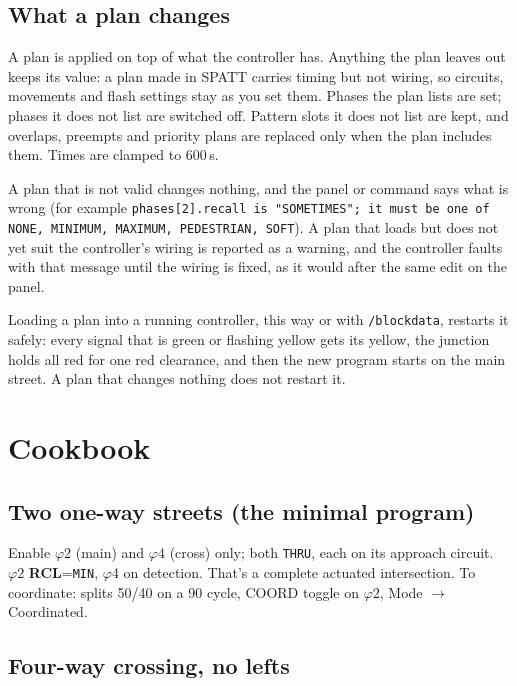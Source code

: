 \documentclass[11pt]{article}
\newcommand{\ph}[1]{\ensuremath{\varphi#1}}
\newcommand{\field}[1]{\textsf{\textbf{#1}}}
\begin{document}
\subsection{What a plan changes}

A plan is applied on top of what the controller has. Anything the plan leaves out
keeps its value: a plan made in SPATT carries timing but not wiring, so circuits,
movements and flash settings stay as you set them. Phases the plan lists are set;
phases it does not list are switched off. Pattern slots it does not list are kept,
and overlaps, preempts and priority plans are replaced only when the plan includes
them. Times are clamped to 600\,s.

A plan that is not valid changes nothing, and the panel or command says what is
wrong (for example \texttt{phases[2].recall is "SOMETIMES"; it must be one of NONE,
MINIMUM, MAXIMUM, PEDESTRIAN, SOFT}). A plan that loads but does not yet suit the
controller's wiring is reported as a warning, and the controller faults with that
message until the wiring is fixed, as it would after the same edit on the panel.

Loading a plan into a running controller, this way or with \texttt{/blockdata},
restarts it safely: every signal that is green or flashing yellow gets its yellow,
the junction holds all red for one red clearance, and then the new program starts on
the main street. A plan that changes nothing does not restart it.

\section{Cookbook}\label{sec:cookbook}

\subsection{Two one-way streets (the minimal program)}

Enable \ph{2} (main) and \ph{4} (cross) only; both \texttt{THRU}, each on its
approach circuit. \ph{2} \field{RCL}=\texttt{MIN}, \ph{4} on detection. That's a
complete actuated intersection. To coordinate: splits 50/40 on a 90 cycle, COORD
toggle on \ph{2}, Mode $\to$ Coordinated.

\subsection{Four-way crossing, no lefts}
\end{document}
